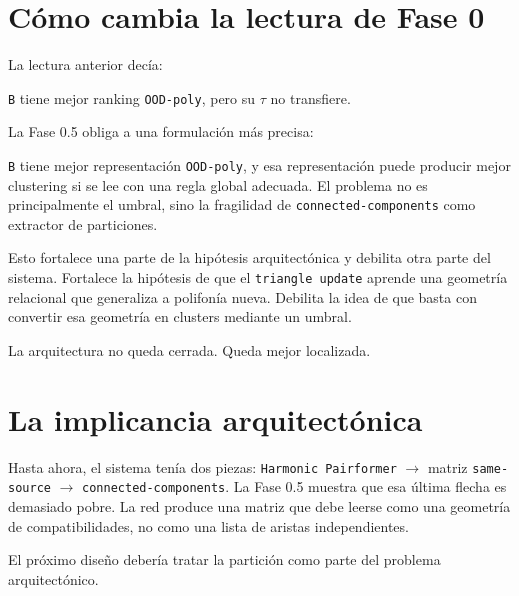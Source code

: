 \documentclass[11pt]{article}
\begin{document}
\section{Cómo cambia la lectura de Fase 0}

La lectura anterior decía:

\begin{quietbox}
\texttt{B} tiene mejor ranking \texttt{OOD-poly}, pero su $\tau$ no transfiere.
\end{quietbox}

La Fase 0.5 obliga a una formulación más precisa:

\begin{goldbox}
\texttt{B} tiene mejor representación \texttt{OOD-poly}, y esa representación puede producir mejor clustering si se lee con una regla global adecuada. El problema no es principalmente el umbral, sino la fragilidad de \texttt{connected-components} como extractor de particiones.
\end{goldbox}

Esto fortalece una parte de la hipótesis arquitectónica y debilita otra parte del sistema. Fortalece la hipótesis de que el \texttt{triangle update} aprende una geometría relacional que generaliza a polifonía nueva. Debilita la idea de que basta con convertir esa geometría en clusters mediante un umbral.

La arquitectura no queda cerrada. Queda mejor localizada.

\section{La implicancia arquitectónica}

Hasta ahora, el sistema tenía dos piezas: \texttt{Harmonic Pairformer} $\to$ matriz \texttt{same-source} $\to$ \texttt{connected-components}. La Fase 0.5 muestra que esa última flecha es demasiado pobre. La red produce una matriz que debe leerse como una geometría de compatibilidades, no como una lista de aristas independientes.

El próximo diseño debería tratar la partición como parte del problema arquitectónico.
\end{document}
